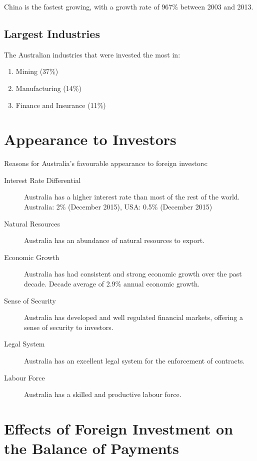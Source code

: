 \documentclass[a4paper,11pt]{article}
\begin{document}
China is the fastest growing, with a growth rate of 967\% between 2003 and
2013.


\subsection{Largest Industries}

The Australian industries that were invested the most in:

\begin{enumerate}
\item Mining (37\%)
\item Manufacturing (14\%)
\item Finance and Insurance (11\%)
\end{enumerate}




\section{Appearance to Investors}

Reasons for Australia's favourable appearance to foreign investors:

\begin{description}
\item [Interest Rate Differential] Australia has a higher interest rate than
	most of the rest of the world. Australia: 2\% (December 2015), USA: 0.5\%
	(December 2015)
\item [Natural Resources] Australia has an abundance of natural resources
	to export.
\item [Economic Growth] Australia has had consistent and strong economic growth
	over the past decade. Decade average of 2.9\% annual economic growth.
\item [Sense of Security] Australia has developed and well regulated financial
	markets, offering a sense of security to investors.
\item [Legal System] Australia has an excellent legal system for the
	enforcement of contracts.
\item [Labour Force] Australia has a skilled and productive labour force.
\end{description}



\section{Effects of Foreign Investment on the Balance of Payments}
\end{document}
